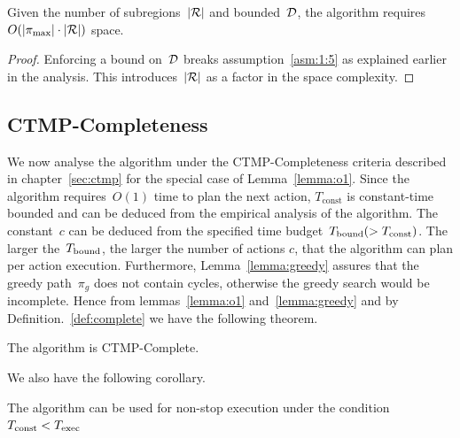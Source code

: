 \documentclass[a4paper]{report}
\begin{document}
\vspace{2mm}
\begin{lemma}
	Given the number of subregions~$|\mathcal{R}|$ and bounded~$\mathcal{D}$, the algorithm requires~$O(|\pi_{\text{max}}| \cdot |\mathcal{R}|)$ space.
\end{lemma}
\begin{proof}
	Enforcing a bound on~$\mathcal{D}$ breaks assumption~\ref{asm:1:5} as explained earlier in the analysis. This introduces~$|\mathcal{R}|$ as a factor in the space complexity.
\end{proof}

\subsection{CTMP-Completeness}
We now analyse the algorithm under the CTMP-Completeness criteria described in chapter~\ref{sec:ctmp} for the special case of Lemma~\ref{lemma:o1}. Since the algorithm requires~$O(1)$ time to plan the next action, $T_\textrm{const}$ is constant-time bounded and can be deduced from the empirical analysis of the algorithm.
%
The constant~$c$ can be deduced from the specified time budget~$T_{\textrm{bound}} (> T_\textrm{const})$. The larger the~$T_{\textrm{bound}}$, the larger the number of actions $c$, that the algorithm can plan per action execution.
%
Furthermore, Lemma~\ref{lemma:greedy} assures that the greedy path~$\pi_g$ does not contain cycles, otherwise the greedy search would be incomplete. Hence from lemmas~\ref{lemma:o1} and~\ref{lemma:greedy} and by Definition.~\ref{def:complete} we have the following theorem.

\vspace{2mm}
\begin{theorem}
	The algorithm is CTMP-Complete.
\end{theorem}

We also have the following corollary.

\vspace{2mm}
\begin{cor}
	The algorithm can be used for non-stop execution under the condition~$T_{\textrm{const}} < T_{\textrm{exec}}$
\end{cor}

\end{document}

